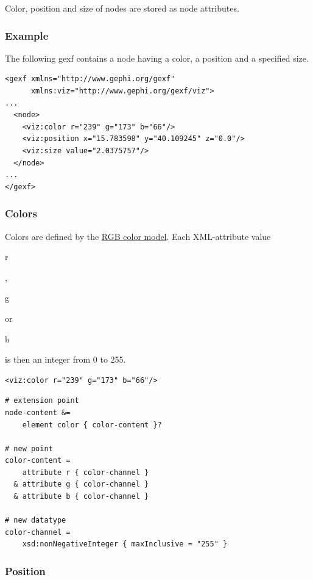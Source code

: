 \documentclass[a4paper,10pt]{article}
\begin{document}
Color, position and size of nodes are stored as node attributes.

\subsubsection{Example}

The following gexf contains a node having a color, a position and a specified size.

\lstset{ style=gexf }
\begin{lstlisting}[caption={VIZ attributes},label=vizattr]
<gexf xmlns="http://www.gephi.org/gexf"
      xmlns:viz="http://www.gephi.org/gexf/viz">
...
  <node>
    <viz:color r="239" g="173" b="66"/>
    <viz:position x="15.783598" y="40.109245" z="0.0"/>
    <viz:size value="2.0375757"/>
  </node>
...
</gexf>
\end{lstlisting}

\subsubsection{Colors}

Colors are defined by the \href{http://en.wikipedia.org/wiki/RGB_color_model}{RGB color model}. Each XML-attribute value \begin{footnotesize}r\end{footnotesize}, \begin{footnotesize}g\end{footnotesize} or \begin{footnotesize}b\end{footnotesize} is then an integer from 0 to 255.

\lstset{ style=gexf }
\begin{lstlisting}[caption={VIZ color declaration},label=vizcolor]
<viz:color r="239" g="173" b="66"/>
\end{lstlisting}

\lstset{ style=rnc }
\begin{lstlisting}[caption={Color Specification},label=colorRNC]
# extension point
node-content &=
    element color { color-content }?

# new point
color-content =
    attribute r { color-channel }
  & attribute g { color-channel }
  & attribute b { color-channel }

# new datatype
color-channel =
    xsd:nonNegativeInteger { maxInclusive = "255" }
\end{lstlisting}

\subsubsection{Position}
\end{document}
